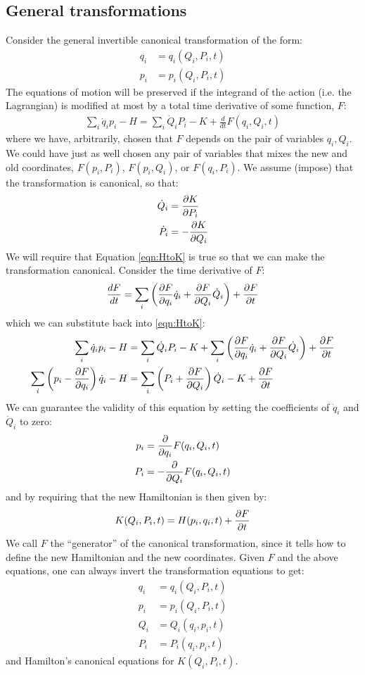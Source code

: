 \subsection{General transformations}
Consider the general invertible canonical transformation of the form:
\begin{align}
q_i&=q_i(Q_i,P_i,t)\nonumber\\
p_i&=p_i(Q_i,P_i,t)
\end{align}
The equations of motion will be preserved if the integrand of the action (i.e. the Lagrangian) is modified at most by a total time derivative of some function, $F$:
\begin{align}
\sum_i\dot q_ip_i-H=\sum_i \dot Q_iP_i-K+\frac{d}{dt}F(q_i,Q_i,t)
\label{eqn:HtoK}
\end{align}
where we have, arbitrarily, chosen that $F$ depends on the pair of variables $q_i, Q_i$. We could have just as well chosen any pair of variables that mixes the new and old coordinates, $F(p_i, P_i)$, $F(p_i, Q_i)$, or $F(q_i, P_i)$. We assume (impose) that the transformation is canonical, so that:
\begin{align}
\dot Q_i&=\frac{\partial K}{\partial P_i}\nonumber\\
\dot P_i&=-\frac{\partial K}{\partial Q_i}
\end{align}
We will require that Equation \ref{eqn:HtoK} is true so that we can make the transformation canonical. Consider the time derivative of $F$:
\begin{align}
\frac{dF}{dt} =\sum_i\left(\frac{\partial F}{\partial q_i}\dot q_i+\frac{\partial F}{\partial Q_i}\dot Q_i\right)+\frac{\partial F}{\partial t}
\end{align}
which we can substitute back into \ref{eqn:HtoK}:
\begin{align}
\sum_i\dot q_ip_i-H&=\sum_i \dot Q_iP_i-K+\sum_i\left(\frac{\partial F}{\partial q_i}\dot q_i+\frac{\partial F}{\partial Q_i}\dot Q_i\right)+\frac{\partial F}{\partial t}\nonumber\\
\sum_i\left(p_i-\frac{\partial F}{\partial q_i}\right)\dot q_i-H&=\sum_i \left(P_i +\frac{\partial F}{\partial Q_i}\right)\dot Q_i-K+\frac{\partial F}{\partial t}
\end{align}
We can guarantee the validity of this equation by setting the coefficients of $\dot q_i$ and $\dot Q_i$ to zero:
\begin{align}
p_i&=\frac{\partial }{\partial q_i}F(q_i,Q_i,t)\nonumber\\
P_i&=-\frac{\partial }{\partial Q_i}F(q_i,Q_i,t)\nonumber
\end{align}
and by requiring that the new Hamiltonian is then given by:
\begin{align}
K(Q_i,P_i,t)=H(p_i,q_i,t)+\frac{\partial F}{\partial t}
\end{align}
We call $F$ the ``generator'' of the canonical transformation, since it tells how to define the new Hamiltonian and the new coordinates. Given $F$ and the above equations, one can always invert the transformation equations to get:
\begin{align}
q_i&=q_i(Q_i,P_i,t)\nonumber\\
p_i&=p_i(Q_i,P_i,t)\nonumber\\
Q_i&=Q_i(q_i,p_i,t)\nonumber\\
P_i&=P_i(q_i,p_i,t)
\end{align}
and Hamilton's canonical equations for $K(Q_i,P_i,t)$.

